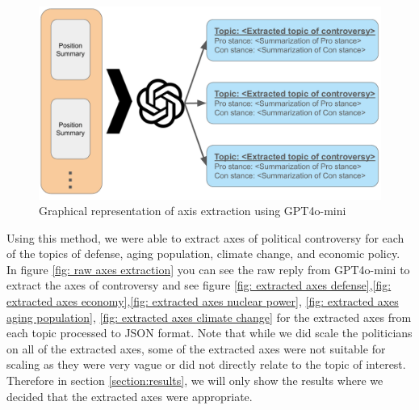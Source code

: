 \documentclass[final,5p,times,twocolumn,authoryear]{elsarticle}
\begin{document}
\begin{figure}[h]
\centering
  \centering
  \includegraphics[width=1\linewidth]{figs/axis.pdf}
  \caption{Graphical representation of axis extraction using GPT4o-mini}
  \label{fig:axis-extraction}
\end{figure}

Using this method, we were able to extract axes of political controversy for each of the topics of defense, aging population, climate change, and economic policy. In figure \ref{fig: raw axes extraction} you can see the raw reply from GPT4o-mini to extract the axes of controversy and see figure \ref{fig: extracted axes defense},\ref{fig: extracted axes economy},\ref{fig: extracted axes nuclear power}, \ref{fig: extracted axes aging population},  \ref{fig: extracted axes climate change} for the extracted axes from each topic processed to JSON format. Note that while we did scale the politicians on all of the extracted axes, some of the extracted axes were not suitable for scaling as they were very vague or did not directly relate to the topic of interest. Therefore in section \ref{section:results}, we will only show the results where we decided that the extracted axes were appropriate.
\end{document}
